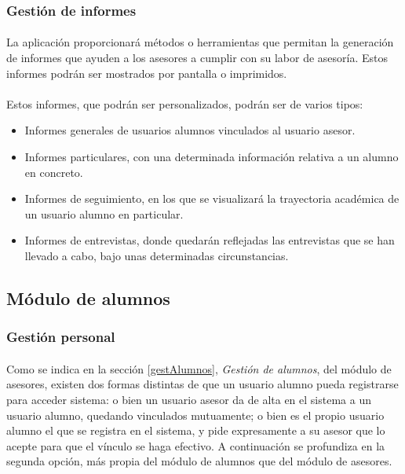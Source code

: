       \subsubsection{Gestión de informes}

      \paragraph{}La aplicación proporcionará métodos o herramientas que
      permitan la generación de informes que ayuden a los asesores a cumplir con
      su labor de asesoría. Estos informes podrán ser mostrados por pantalla o
      imprimidos.

      \paragraph{}Estos informes, que podrán ser personalizados, podrán ser
      de varios tipos:

      \begin{itemize}
       \item Informes generales de usuarios alumnos vinculados al usuario
             asesor.
       \item Informes particulares, con una determinada información relativa a
             un alumno en concreto.
       \item Informes de seguimiento, en los que se visualizará la trayectoria
             académica de un usuario alumno en particular.
       \item Informes de entrevistas, donde quedarán reflejadas las entrevistas
             que se han llevado a cabo, bajo unas determinadas circunstancias.
      \end{itemize}


   \subsection{Módulo de alumnos}\label{modAlumnos}

      \subsubsection{Gestión personal}

      \paragraph{}Como se indica en la sección \ref{gestAlumnos},
      \textit{Gestión de alumnos}, del módulo de asesores, existen dos formas
      distintas de que un usuario alumno pueda registrarse para acceder sistema:
      o bien un usuario asesor da de alta en el sistema a un usuario alumno,
      quedando vinculados mutuamente; o bien es el propio usuario alumno el que
      se registra en el sistema, y pide expresamente a su asesor que lo acepte
      para que el vínculo se haga efectivo. A continuación se profundiza en
      la segunda opción, más propia del módulo de alumnos que del módulo de
      asesores.

